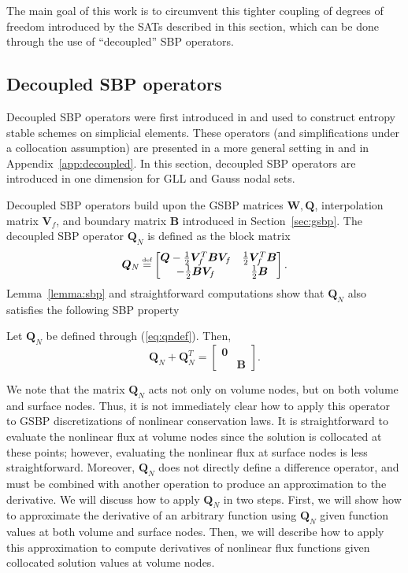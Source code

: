 \documentclass[onefignum,onetabnum,final]{siamart171218}
\newcommand\myeq{\mathrel{\stackrel{\makebox[0pt]{\mbox{\normalfont\tiny def}}}{=}}}
\begin{document}
The main goal of this work is to circumvent this tighter coupling of degrees of freedom introduced by the SATs described in this section, which can be done through the use of ``decoupled'' SBP operators.  

\subsection{Decoupled SBP operators}

Decoupled SBP operators were first introduced in \cite{chan2017discretely} and used to construct entropy stable schemes on simplicial elements.  These operators (and simplifications under a collocation assumption) are presented in a more general setting in \cite{chan2017discretely, chan2018discretely} and in Appendix~\ref{app:decoupled}.  In this section, decoupled SBP operators are introduced in one dimension for GLL and Gauss nodal sets.  

Decoupled SBP operators build upon the GSBP matrices $\bm{W}, \bm{Q}$, interpolation matrix $\bm{V}_f$, and boundary matrix $\bm{B}$ introduced in Section~\ref{sec:gsbp}.  The decoupled SBP operator $\bm{Q}_N$ is defined as the block matrix 
\begin{equation}
\bm{Q}_N \myeq \begin{bmatrix}
\bm{Q} - \frac{1}{2}\bm{V}_f^T\bm{B}\bm{V}_f & \frac{1}{2}\bm{V}_f^T\bm{B}\\
-\frac{1}{2}\bm{B}\bm{V}_f & \frac{1}{2}\bm{B}
\end{bmatrix}.
\label{eq:qndef}
\end{equation}
Lemma~\ref{lemma:sbp} and straightforward computations show that $\bm{Q}_N$ also satisfies the following SBP property
\begin{lemma}
\label{lemma:dsbp}
Let $\bm{Q}_N$ be defined through (\ref{eq:qndef}).  Then,
\[
\bm{Q}_N + \bm{Q}_N^T = \begin{bmatrix}
\bm{0} &\\
& \bm{B}
\end{bmatrix}.
\]
\end{lemma}

We note that the matrix $\bm{Q}_N$ acts not only on volume nodes, but on both volume and surface nodes.  Thus, it is not immediately clear how to apply this operator to GSBP discretizations of nonlinear conservation laws.  It is straightforward to evaluate the nonlinear flux at volume nodes since the solution is collocated at these points; however, evaluating the nonlinear flux at surface nodes is less straightforward.  Moreover, $\bm{Q}_N$ does not directly define a difference operator, and must be combined with another operation to produce an approximation to the derivative.  We will discuss how to apply $\bm{Q}_N$ in two steps.  First, we will show how to approximate the derivative of an arbitrary function using $\bm{Q}_N$ given function values at both volume and surface nodes.  Then, we will describe how to apply this approximation to compute derivatives of nonlinear flux functions given collocated solution values at volume nodes.    
\end{document}
